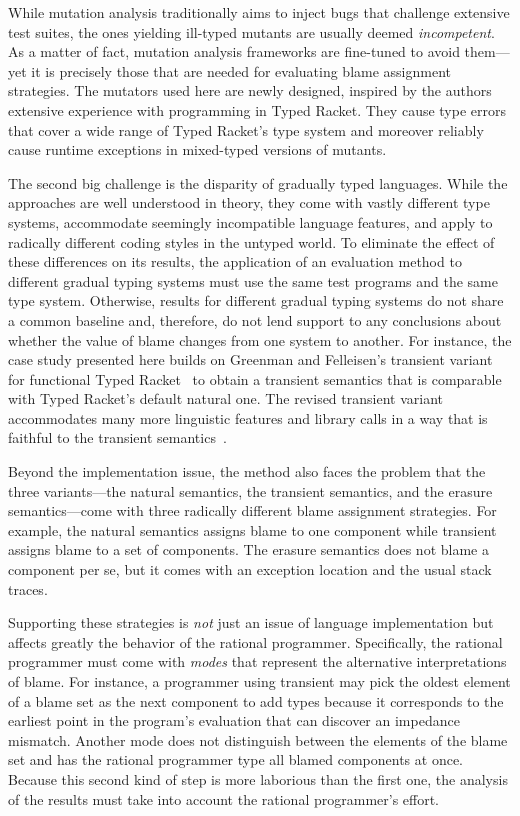 While mutation analysis traditionally aims to inject bugs that challenge
extensive test suites, the ones yielding ill-typed mutants are usually deemed
\emph{incompetent}. As a matter of fact, mutation analysis frameworks are
fine-tuned to avoid them---yet it is precisely those that are needed for
evaluating blame assignment strategies. The mutators used here are newly designed,
inspired by the authors extensive experience with programming in Typed Racket.
They cause type errors that cover a wide range of Typed Racket's type system and moreover
reliably cause runtime exceptions in mixed-typed versions of mutants.

The second big challenge is the disparity of gradually
typed languages. While the approaches are well understood in theory,
they come with vastly different type systems, accommodate seemingly
incompatible language features, and apply to radically different coding
styles in the untyped world.  To eliminate the effect of these differences 
on its results, the application of an evaluation method to different
gradual typing systems must use the same test programs and the same type
system. Otherwise, results for different gradual typing systems 
do not share a common baseline and, therefore, do not lend support to any
conclusions about whether the value of blame changes from one system to
another. For instance, the case study presented here builds on
Greenman and Felleisen's transient variant for functional Typed
Racket~\cite{gf-icfp-2018} to obtain a transient semantics that is
comparable with Typed Racket's default natural one. The revised transient
variant accommodates many more linguistic features and library calls
in a way that is faithful to the transient
semantics~\cite{vss-popl-2017}.

Beyond the implementation issue, the method also faces the problem that
the three variants---the natural semantics, the transient semantics, and
the erasure semantics---come with three radically different blame
assignment strategies.  For example, the natural semantics assigns blame
to one component while transient assigns blame to a set of components. The
erasure semantics does not blame a component per se, but it comes with an
exception location and the usual stack traces. 

Supporting these strategies is {\em not\/} just an issue of language
implementation but affects greatly the behavior of the rational programmer.
Specifically, the rational programmer must come with \emph{modes}
that represent the alternative interpretations of blame. 
For instance, a programmer using transient may
pick the oldest element of a blame set as the next component to add types because
it corresponds to the earliest point in the program's evaluation that can
discover an impedance mismatch.  Another mode does not distinguish between the elements of the
blame set and has the rational programmer type all blamed components
at once. Because this second kind of step 
is more laborious than the first one, the analysis of the results must take 
into account the rational programmer's effort.

